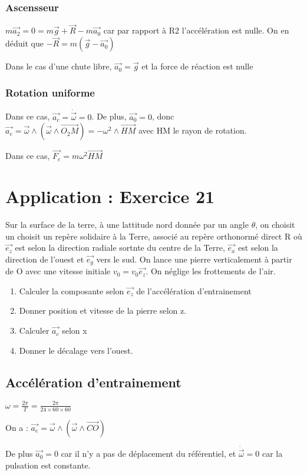 \documentclass[french]{yLectureNote}
\renewcommand{\vec}{\overrightarrow}
\begin{document}
\subsubsection{Ascensseur}
\(m\vec{a_2} = 0 = m\vec{g}+\vec{R}-m\vec{a_0}\) car par rapport à R2 l'accélération est nulle. On en déduit que \(-\vec{R}=m(\vec{g}-\vec{a_0})\)

Dans le cas d'une chute libre, \(\vec{a_0} = \vec{g}\) et la force de réaction est nulle
\subsubsection{Rotation uniforme}
Dans ce cas, \(\vec{a_c} = \dot{\vec{\omega}} = 0\). De plus, \(\vec{a_0} = 0\), donc \(\vec{a_e} = \vec{\omega}\wedge (\vec{\omega}\wedge \vec{O_2M}) =- \omega^2\wedge \vec{HM}\) avec HM le rayon de rotation.

Dans ce cas, \(\vec{F_e} =  m\omega^2\vec{HM}\)
\section{Application : Exercice 21}
Sur la surface de la terre, à une lattitude nord donnée par un angle \(\theta\), on choisit un choisit un repère solidaire à la Terre, associé au repère orthonormé direct R où \(\vec{e_z}\) est selon la direction radiale sortnte du centre de la Terre, \(\vec{e_x}\) est selon la direction de l'ouest et \(\vec{e_y}\) vers le sud. On lance une pierre verticalement à partir de O avec une vitesse initiale \(v_0 = v_0\vec{e_z}\). On néglige les frottements de l'air.
\begin{enumerate}
 \item Calculer la composante selon \(\vec{e_z}\) de l'accélération d'entrainement
 \item Donner position et vitesse de la pierre selon z.
 \item Calculer \(\vec{a_c}\) selon x
 \item Donner le décalage vers l'ouest.
\end{enumerate}
\subsection{Accélération d'entrainement}
\(\omega = \frac{2\pi}{T} = \frac{2\pi}{24\times60\times 60}\)

On a : \(\vec{a_e} = \vec{\omega}\wedge (\vec{\omega}\wedge \vec{CO})\)

De plus \(\vec{a_0} = 0\) car il n'y a pas de déplacement du référentiel, et \(\dot{\vec{\omega}} = 0\) car la pulsation est constante.
\end{document}

